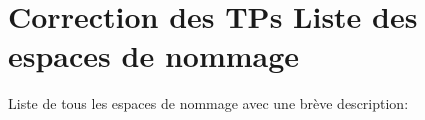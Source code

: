 \section{Correction des TPs Liste des espaces de nommage}
Liste de tous les espaces de nommage avec une br\`{e}ve description:\begin{CompactList}
\item{}
\end{CompactList}
